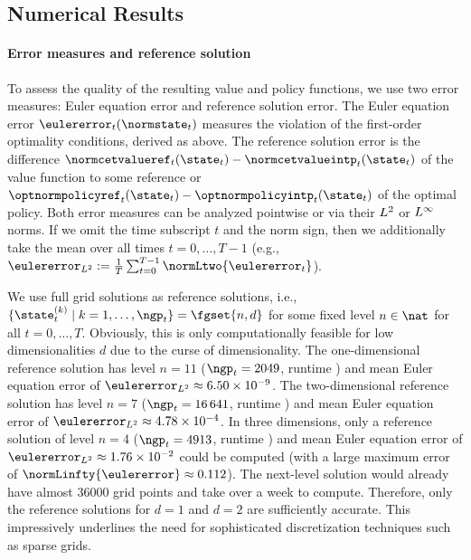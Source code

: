 \subsection{Numerical Results}

\paragraph{Error measures and reference solution}

To assess the quality of the resulting value and policy functions,
we use two error measures:
Euler equation error and reference solution error.
The Euler equation error $\eulererror_t(\normstate_t)$
measures the violation of the first-order optimality conditions,
derived as above.
The reference solution error is the difference
$\normcetvalueref_t(\state_t) - \normcetvalueintp_t(\state_t)$
of the value function to some reference or
$\optnormpolicyref_t(\state_t) - \optnormpolicyintp_t(\state_t)$
of the optimal policy.
Both error measures can be analyzed pointwise or
via their $L^2$ or $L^\infty$ norms.
If we omit the time subscript $t$ and the norm sign,
then we additionally take the mean over all times $t = 0, \dotsc, T - 1$
(e.g., $
  \eulererror_{\Ltwo} := \frac{1}{T} \sum_{t=0}^{T-1} \normLtwo{\eulererror_t}
$).

We use full grid solutions as reference solutions,
i.e., $\{\state_t^{(k)} \mid k = 1, \dotsc, \ngp_t\} = \fgset{n,d}$
for some fixed level $n \in \nat$ for all $t = 0, \dotsc, T$.
Obviously, this is only computationally feasible
for low dimensionalities $d$ due to the curse of dimensionality.
The one-dimensional reference solution has level $n = 11$
($\ngp_t = \num{2049}$, runtime ) and
mean Euler equation error of
$\eulererror_{\Ltwo} \approx \num{6.50e-9}$.
The two-dimensional reference solution has level $n = 7$
($\ngp_t = \num{16641}$, runtime ) and
mean Euler equation error of
$\eulererror_{\Ltwo} \approx \num{4.78e-4}$.
In three dimensions, only a reference solution of level $n = 4$
($\ngp_t = \num{4913}$, runtime ) and
mean Euler equation error of
$\eulererror_{\Ltwo} \approx \num{1.76e-2}$ could be computed
(with a large maximum error of $\normLinfty{\eulererror} \approx \num{0.112}$).
The next-level solution would already have almost \num{36000} grid points
and take over a week to compute.
Therefore, only the reference solutions for $d = 1$ and $d = 2$
are sufficiently accurate.
This impressively underlines the need for sophisticated
discretization techniques such as sparse grids.

